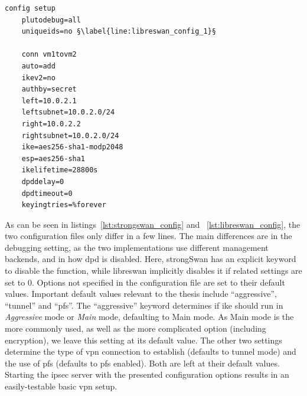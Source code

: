 \begin{lstlisting}[mathescape=true, float=ht, caption=Configuration options of the libreswan server., label=lst:libreswan_config, escapechar=§]
	config setup
	plutodebug=all
	uniqueids=no §\label{line:libreswan_config_1}§
	
	conn vm1tovm2
	auto=add
	ikev2=no
	authby=secret
	left=10.0.2.1 
	leftsubnet=10.0.2.0/24
	right=10.0.2.2
	rightsubnet=10.0.2.0/24
	ike=aes256-sha1-modp2048
	esp=aes256-sha1
	ikelifetime=28800s
	dpddelay=0
	dpdtimeout=0
	keyingtries=%forever
\end{lstlisting}

As can be seen in listings~\ref{lst:strongswan_config} and ~\ref{lst:libreswan_config}, the two configuration files only differ in a few lines. The main differences are in the debugging setting, as the two implementations use different management backends, and in how \ac{dpd} is disabled. Here, strongSwan has an explicit keyword to disable the function, while libreswan implicitly disables it if related settings are set to 0. Options not specified in the configuration file are set to their default values. Important default values relevant to the thesis include ``aggressive'', ``tunnel'' and ``pfs''. The ``aggressive'' keyword determines if \ac{ike} should run in \emph{Aggressive} mode or \emph{Main} mode, defaulting to Main mode. As Main mode is the more commonly used, as well as the more complicated option (including encryption), we leave this setting at its default value. The other two settings determine the type of \ac{vpn} connection to establish (defaults to tunnel mode) and the use of \ac{pfs} (defaults to \ac{pfs} enabled). Both are left at their default values. Starting the \ac{ipsec} server with the presented configuration options results in an easily-testable basic \ac{vpn} setup.
\newpage

